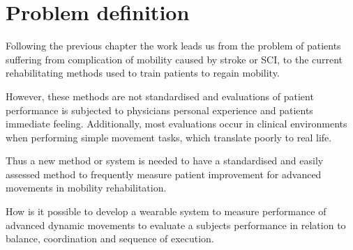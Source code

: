 \section{Problem definition}

Following the previous chapter the work leads us from the problem of patients suffering from complication of mobility caused by stroke or SCI, to the current rehabilitating methods used to train patients to regain mobility. 

However, these methods are not standardised and evaluations of patient performance is subjected to physicians personal experience and patients immediate feeling. Additionally, most evaluations occur in clinical environments when performing simple movement tasks, which translate poorly to real life. 

Thus a new method or system is needed to have a standardised and easily assessed method to frequently measure patient improvement for advanced movements in mobility rehabilitation.

\begin{center}
How is it possible to develop a wearable system to measure performance of advanced dynamic movements to evaluate a subjects performance in relation to balance, coordination and sequence of execution.
\end{center}
